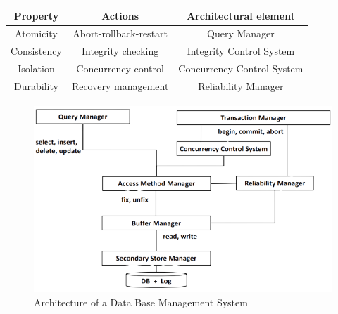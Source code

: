 \begin{table}[H]
    \centering
    \begin{tabular}{c|c|c}
    \textbf{Property} & \textbf{Actions}       & \textbf{Architectural element} \\ \hline
    Atomicity         & Abort-rollback-restart & Query Manager                  \\
    Consistency       & Integrity checking     & Integrity Control System       \\
    Isolation         & Concurrency control    & Concurrency Control System     \\
    Durability        & Recovery management    & Reliability Manager           
    \end{tabular}
\end{table}
\begin{figure}[H]
    \centering
    \includegraphics[width=0.75\linewidth]{images/architecture.png}
    \caption{Architecture of a Data Base Management System}
\end{figure}
